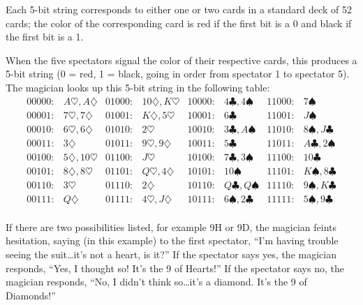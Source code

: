 \documentclass{article}
\theoremstyle{plain}
\theoremstyle{definition}
\theoremstyle{remark}
\begin{document}
Each 5-bit string corresponds to either one or two cards in a standard deck of 52 cards; the color of the corresponding card is red if the first bit is a 0 and black if the first bit is a 1. 

When the five spectators signal the color of their respective cards, this produces a 5-bit string (0 = red, 1 = black, going in order from spectator 1 to spectator 5). The magician looks up this 5-bit string in the following table:
\[
\begin{array}{llllllll}
00000: & A\heartsuit, A\diamondsuit  & 01000: & 10\diamondsuit,  K\heartsuit & 10000: & 4\clubsuit,4\spadesuit & 11000: & 7\spadesuit \\
00001: & 7\heartsuit, 7\diamondsuit  & 01001: & K\diamondsuit, 5\heartsuit & 10001: & 6\clubsuit & 11001: & J\spadesuit \\
00010: & 6\heartsuit, 6\diamondsuit  & 01010: & 2\heartsuit & 10010: & 3\clubsuit,A\spadesuit & 11010: & 8\spadesuit, J\clubsuit \\
00011: & 3\diamondsuit & 01011: & 9\heartsuit, 9\diamondsuit & 10011: & 5\clubsuit & 11011: & A\clubsuit,2\spadesuit \\
00100: & 5\diamondsuit, 10\heartsuit & 01100: & J\heartsuit & 10100: & 7\clubsuit, 3\spadesuit & 11100: & 10\clubsuit \\
00101: & 8\diamondsuit, 8\heartsuit & 01101: & Q\heartsuit,4\diamondsuit & 10101: & 10\spadesuit  & 11101: & K\spadesuit, 8\clubsuit \\
00110: & 3\heartsuit & 01110: & 2\diamondsuit & 10110: & Q\clubsuit, Q\spadesuit & 11110: & 9\spadesuit, K\clubsuit \\
00111: & Q\diamondsuit & 01111: & 4\heartsuit,J\diamondsuit & 10111: & 6\spadesuit, 2\clubsuit & 11111: & 5\spadesuit, 9\clubsuit \\
\end{array}
\]

If there are two possibilities listed, for example 9H or 9D, the magician feints hesitation, saying (in this example) to the first spectator, ``I'm having trouble seeing the suit\ldots it's not a heart, is it?'' If the spectator says yes, the magician responds, ``Yes, I thought so! It's the 9 of Hearts!'' If the spectator says no, the magician responds, ``No, I didn't think so\ldots it's a diamond. It's the 9 of Diamonds!''
\end{document}
